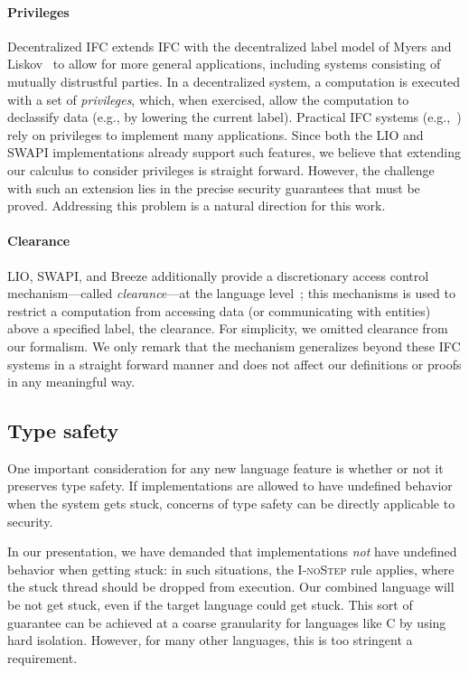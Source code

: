 \paragraph{Privileges}
Decentralized IFC extends IFC with the decentralized label model of
Myers and Liskov~\cite{myers:dlm} to allow for more general
applications, including systems consisting of mutually distrustful
parties.  In a decentralized system, a computation is executed with a
set of \emph{privileges}, which, when exercised, allow the computation
to declassify data (e.g., by lowering the current label).
%
Practical IFC systems
(e.g.,~\cite{Zeldovich:2006, lio,
Hritcu:2013:YIB:2497621.2498098, myers:jif}) rely on privileges to
implement many applications.
%
Since both the LIO and SWAPI implementations already support such features,
we believe that extending our calculus to consider privileges is
straight forward.
%
However, the challenge with such an extension lies in the precise
security guarantees that must be proved.
%
Addressing this problem is a natural direction for this work.

\paragraph{Clearance}
%
LIO, SWAPI, and Breeze additionally provide a discretionary access
control mechanism---called \emph{clearance}---at the language
level~\cite{Hritcu:2013:YIB:2497621.2498098, lio}; this mechanisms is
used to restrict a computation from accessing data (or communicating
with entities) above a specified label, the clearance.
%
For simplicity, we omitted clearance from our formalism.
%
We only remark that the mechanism generalizes beyond these IFC systems
in a straight forward manner and does not affect our definitions or
proofs in any meaningful way.


\subsection{Type safety}
\label{sec:extensions:types}

One important consideration for any new language feature is whether
or not it preserves type safety.  If implementations are allowed to
have undefined behavior when the system gets stuck, concerns of type
safety can be directly applicable to security.

In our presentation, we have demanded that implementations \emph{not}
have undefined behavior when getting stuck: in such situations, the
\textsc{I-noStep} rule applies, where the stuck thread should be dropped
from execution.  Our combined language will be not get stuck, even if
the target language could get stuck.  This sort of guarantee can be
achieved at a coarse granularity for languages like C by using hard
isolation.  However, for many other languages, this is too stringent a
requirement.

